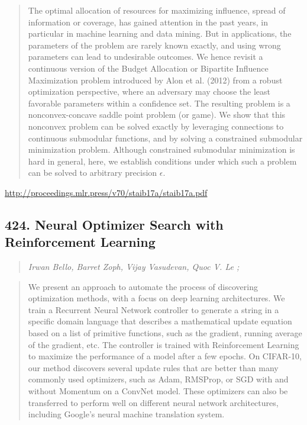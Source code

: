 \documentclass{article}
\begin{document}
\begin{quote}
    The optimal allocation of resources for maximizing influence, spread of information or coverage, has gained attention in the past years, in particular in machine learning and data mining. But in applications, the parameters of the problem are rarely known exactly, and using wrong parameters can lead to undesirable outcomes. We hence revisit a continuous version of the Budget Allocation or Bipartite Influence Maximization problem introduced by Alon et al. (2012) from a robust optimization perspective, where an adversary may choose the least favorable parameters within a confidence set. The resulting problem is a nonconvex-concave saddle point problem (or game). We show that this nonconvex problem can be solved exactly by leveraging connections to continuous submodular functions, and by solving a constrained submodular minimization problem. Although constrained submodular minimization is hard in general, here, we establish conditions under which such a problem can be solved to arbitrary precision $\epsilon$.  
\end{quote}

\href{http://proceedings.mlr.press/v70/staib17a/staib17a.pdf}{http://proceedings.mlr.press/v70/staib17a/staib17a.pdf}

\subsection{424. Neural Optimizer Search with Reinforcement Learning}

\begin{quote}
\footnotesize{\textit{Irwan Bello, Barret Zoph, Vijay Vasudevan, Quoc V. Le ;}}

\end{quote}

\begin{quote}
    We present an approach to automate the process of discovering optimization methods, with a focus on deep learning architectures. We train a Recurrent Neural Network controller to generate a string in a specific domain language that describes a mathematical update equation based on a list of primitive functions, such as the gradient, running average of the gradient, etc. The controller is trained with Reinforcement Learning to maximize the performance of a model after a few epochs. On CIFAR-10, our method discovers several update rules that are better than many commonly used optimizers, such as Adam, RMSProp, or SGD with and without Momentum on a ConvNet model. These optimizers can also be transferred to perform well on different neural network architectures, including Google’s neural machine translation system.  
\end{quote}
\end{document}
